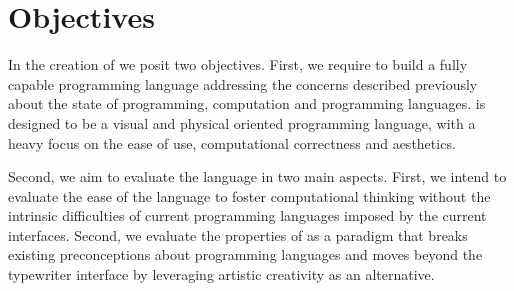 \section{Objectives}
\label{sec:objectives}
In the creation of \sculpt we posit two objectives.
First, we require to build a fully capable programming language addressing the concerns described previously about the state of programming, computation and programming languages.
\sculpt is designed to be a visual and physical oriented programming language, with a heavy focus on the ease of use, computational correctness and aesthetics.

Second, we aim to evaluate the language in two main aspects.
First, we intend to evaluate the ease of the language to foster computational thinking without the intrinsic difficulties of current programming languages imposed by the current interfaces.
Second, we evaluate the properties of \sculpt as a paradigm that breaks existing preconceptions about programming languages and moves beyond 
the typewriter interface by leveraging artistic creativity as an alternative.
\endinput